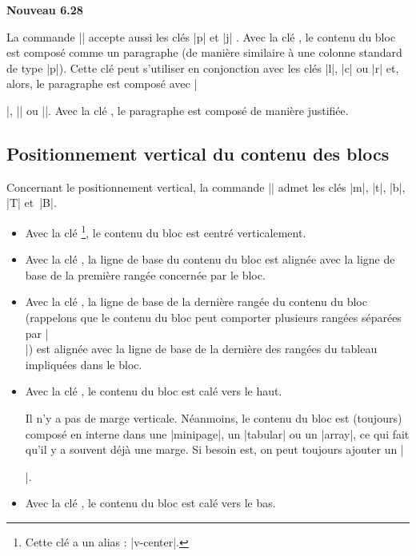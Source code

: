 \documentclass[dvipsnames]{article}%
\begin{document}
\bigskip
\colorbox{yellow!50}{\bfseries Nouveau 6.28}\par\nobreak

\smallskip
La commande |\Block| accepte aussi les clés |p| et |j| . Avec la clé
, le contenu du bloc est composé comme un paragraphe (de manière
similaire à une colonne standard de type |p|). Cette clé peut s'utiliser en
conjonction avec les clés |l|, |c| ou |r| et, alors, le paragraphe est composé
avec |\raggedright|, |\centering| ou |\raggedleft|. Avec la clé ,
le paragraphe est composé de manière justifiée.


\subsection{Positionnement vertical du contenu des blocs}


\label{vertical-pos-block}

Concernant le positionnement vertical, la commande |\Block| admet les clés
|m|, |t|, |b|, |T| et~|B|.


\begin{itemize}
\item {}
Avec la clé \footnote{Cette clé a un alias : |v-center|.}, le
contenu du bloc est centré verticalement. 

\item Avec la clé , la ligne de base du contenu du bloc est alignée avec la
ligne de base de la première rangée concernée par le bloc.

\item Avec la clé , la ligne de base de la dernière rangée du contenu du bloc
(rappelons que le contenu du bloc peut comporter plusieurs rangées séparées par
|\\|) est alignée avec la ligne de base de la dernière des rangées du tableau
impliquées dans le bloc.

\item Avec la clé , le contenu du bloc est calé vers le haut.

Il n'y a pas de marge verticale. Néanmoins, le contenu du bloc est (toujours)
composé en interne dans une |{minipage}|, un |{tabular}| ou un |{array}|, ce qui
fait qu'il y a souvent déjà une marge. Si besoin est, on peut toujours ajouter
un |\strut|.

\item Avec la clé , le contenu du bloc est calé vers le bas.
\end{itemize}
\end{document}
